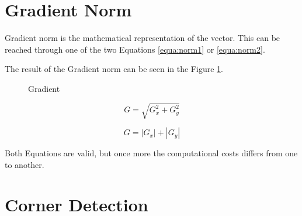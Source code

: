 \documentclass{article}
\begin{document}
\section{Gradient Norm}

Gradient norm is the mathematical representation of the vector. This can be reached through one of the two Equations \ref{equa:norm1} or \ref{equa:norm2}.

The result of the Gradient norm can be seen in the Figure \ref{fig:norm_gradient}. 

\begin{figure}[H]
	\centering
	\caption{Gradient}
	\label{fig:norm_gradient}
\end{figure}


\begin{equation}
G = \sqrt{G_x^{2}+G_y^{2}}
\label{equa:norm1}
\end{equation}

\begin{equation}
G = | G_x | + | G_y |
\label{equa:norm2}
\end{equation}

Both Equations are valid, but once more the computational costs differs from one to another.

\section{Corner Detection}
\end{document}

